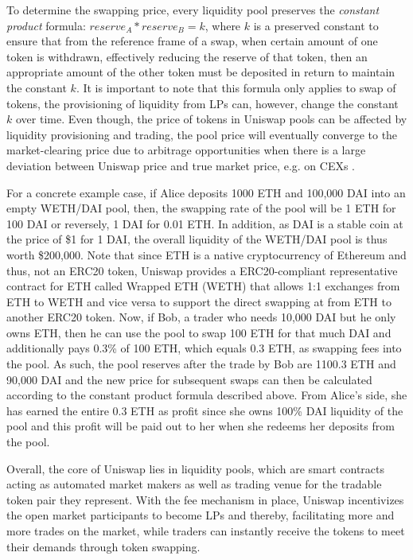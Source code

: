 To determine the swapping price, every liquidity pool preserves the \textit{constant product} formula: $reserve_A * reserve_B = k$, where $k$ is a preserved constant \cite{HowUniswapWorks} to ensure that from the reference frame of a swap, when certain amount of one token is withdrawn, effectively reducing the reserve of that token, then an appropriate amount of the other token must be deposited in return to maintain the constant $k$. It is important to note that this formula only applies to swap of tokens, the provisioning of liquidity from LPs can, however, change the constant $k$ over time. Even though, the price of tokens in Uniswap pools can be affected by liquidity provisioning and trading, the pool price will eventually converge to the market-clearing price due to arbitrage opportunities when there is a large deviation between Uniswap price and true market price, e.g. on CEXs \cite{Adams2020UniswapVC}. 


For a concrete example case, if Alice deposits 1000 ETH and 100,000 DAI into an empty WETH/DAI pool, then, the swapping rate of the pool will be 1 ETH for 100 DAI or reversely, 1 DAI for 0.01 ETH. In addition, as DAI is a stable coin at the price of \$1 for 1 DAI, the overall liquidity of the WETH/DAI pool is thus worth \$200,000. Note that since ETH is a native cryptocurrency of Ethereum and thus, not an ERC20 token, Uniswap provides a ERC20-compliant representative contract for ETH called Wrapped ETH (WETH) that allows 1:1 exchanges from ETH to WETH and vice versa to support the direct swapping at from ETH to another ERC20 token. Now, if Bob, a trader who needs 10,000 DAI but he only owns ETH, then he can use the pool to swap 100 ETH for that much DAI and additionally pays 0.3\% of 100 ETH, which equals 0.3 ETH, as swapping fees into the pool. As such, the pool reserves after the trade by Bob are 1100.3 ETH and 90,000 DAI and the new price for subsequent swaps can then be calculated according to the constant product formula described above. From Alice's side, she has earned the entire 0.3 ETH as profit since she owns 100\% DAI liquidity of the pool and this profit will be paid out to her when she redeems her deposits from the pool. 

Overall, the core of Uniswap lies in liquidity pools, which are smart contracts acting as automated market makers as well as trading venue for the tradable token pair they represent. With the fee mechanism in place, Uniswap incentivizes the open market participants to become LPs and thereby, facilitating more and more trades on the market, while traders can instantly receive the tokens to meet their demands through token swapping. 
